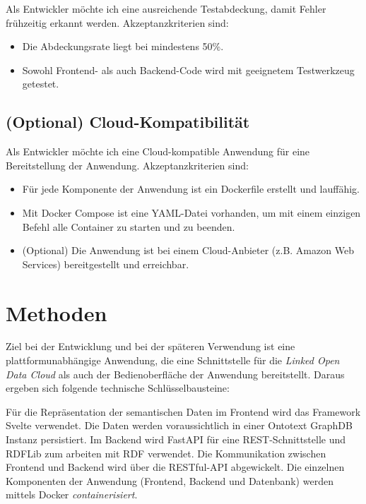 \documentclass[a4paper, 10pt, conference]{IEEEtran}
\begin{document}
Als Entwickler möchte ich eine ausreichende Testabdeckung, damit Fehler frühzeitig erkannt werden.
Akzeptanzkriterien sind:
\begin{itemize}
    \item Die Abdeckungsrate liegt bei mindestens 50\%.
    \item Sowohl Frontend- als auch Backend-Code wird mit geeignetem Testwerkzeug getestet.
\end{itemize}


\subsection{(Optional) Cloud-Kompatibilität}

Als Entwickler möchte ich eine Cloud-kompatible Anwendung für eine Bereitstellung der Anwendung.  Akzeptanzkriterien sind:
\begin{itemize}
    \item Für jede Komponente der Anwendung ist ein Dockerfile erstellt und lauffähig.
    \item Mit Docker Compose ist eine YAML-Datei vorhanden, um mit einem einzigen Befehl alle Container zu starten und zu beenden.
    \item (Optional) Die Anwendung ist bei einem Cloud-Anbieter (z.B. Amazon Web Services) bereitgestellt und erreichbar.
\end{itemize}


\section{Methoden}\label{sec:methoden}

Ziel bei der Entwicklung und bei der späteren Verwendung ist eine plattformunabhängige Anwendung, die eine Schnittstelle für die \textit{Linked Open Data Cloud} als auch der Bedienoberfläche der Anwendung bereitstellt. Daraus ergeben sich folgende technische Schlüsselbausteine:

Für die Repräsentation der semantischen Daten im Frontend wird das Framework Svelte verwendet. Die Daten werden voraussichtlich in einer Ontotext GraphDB Instanz persistiert. Im Backend wird FastAPI für eine REST-Schnittstelle und RDFLib zum arbeiten mit RDF verwendet. Die Kommunikation zwischen Frontend und Backend wird über die RESTful-API abgewickelt. Die einzelnen Komponenten der Anwendung (Frontend, Backend und Datenbank) werden mittels Docker \textit{containerisiert}.


\printbibliography
\end{document}
